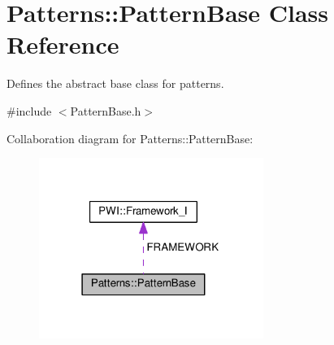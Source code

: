 \hypertarget{class_patterns_1_1_pattern_base}{}\section{Patterns\+:\+:Pattern\+Base Class Reference}
\label{class_patterns_1_1_pattern_base}


Defines the abstract base class for patterns.  




{\ttfamily \#include $<$Pattern\+Base.\+h$>$}



Collaboration diagram for Patterns\+:\+:Pattern\+Base\+:
\nopagebreak
\begin{figure}[H]
\begin{center}
\leavevmode
\includegraphics[width=207pt]{apis/class_patterns_1_1_pattern_base__coll__graph}
\end{center}
\end{figure}
